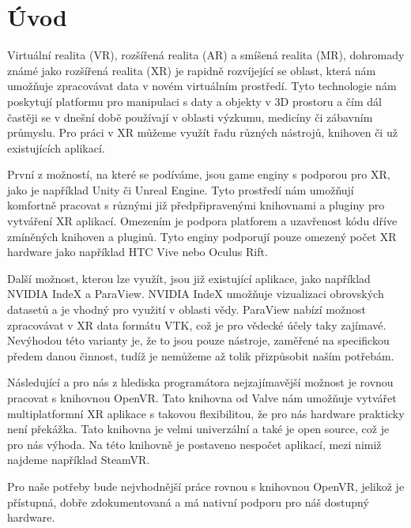 \documentclass[czech]{article}
\begin{document}
\section{Úvod}
\par{Virtuální realita (VR), rozšířená realita (AR) a smíšená realita (MR), dohromady známé jako rozšířená realita (XR) je rapidně rozvíjející se oblast, která nám umožňuje zpracovávat data v novém virtuálním prostředí. Tyto technologie nám poskytují platformu pro manipulaci s daty a objekty v 3D prostoru a čím dál častěji se v dnešní době používají v oblasti výzkumu, medicíny či zábavním průmyslu. Pro práci v XR můžeme využít řadu různých nástrojů, knihoven či už existujících aplikací.}
\par{První z možností, na které se podíváme, jsou game enginy s podporou pro XR, jako je například Unity či Unreal Engine. Tyto prostředí nám umožňují komfortně pracovat s různými již předpřipravenými knihovnami a pluginy pro vytváření XR aplikací. Omezením je podpora platforem a uzavřenost kódu dříve zmíněných knihoven a pluginů. Tyto enginy podporují pouze omezený počet XR hardware jako například HTC Vive nebo Oculus Rift.}
\par{Další možnost, kterou lze využít, jsou již existující aplikace, jako například NVIDIA IndeX a ParaView. NVIDIA IndeX umožňuje vizualizaci obrovských datasetů a je vhodný pro využití v oblasti vědy. ParaView nabízí možnost zpracovávat v XR data formátu VTK, což je pro vědecké účely taky zajímavé. Nevýhodou této varianty je, že to jsou pouze nástroje, zaměřené na specifickou předem danou činnost, tudíž je nemůžeme až tolik přizpůsobit naším potřebám.}
\par{Následující a pro nás z hlediska programátora nejzajímavější možnost je rovnou pracovat s knihovnou OpenVR. Tato knihovna od Valve nám umožňuje vytvářet multiplatformní XR aplikace s takovou flexibilitou, že pro nás hardware prakticky není překážka. Tato knihovna je velmi univerzální a také je open source, což je pro nás výhoda. Na této knihovně je postaveno nespočet aplikací, mezi nimiž najdeme například SteamVR.}
\par{Pro naše potřeby bude nejvhodnější práce rovnou s knihovnou OpenVR, jelikož je přístupná, dobře zdokumentovaná a má nativní podporu pro náš dostupný hardware.}
\end{document}
